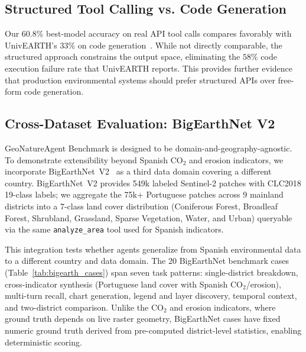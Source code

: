 \documentclass[sigconf]{acmart}
\begin{document}
\subsection{Structured Tool Calling vs. Code Generation}

Our $60.8\%$ best-model accuracy on real API tool calls compares favorably with UnivEARTH's $33\%$ on code generation~\citep{kao2025univearth}. While not directly comparable, the structured approach constrains the output space, eliminating the $58\%$ code execution failure rate that UnivEARTH reports. This provides further evidence that production environmental systems should prefer structured APIs over free-form code generation.

\subsection{Cross-Dataset Evaluation: BigEarthNet V2}
\label{sec:validation}

GeoNatureAgent Benchmark is designed to be domain-and-geogra\-phy-agnostic. To demonstrate extensibility beyond Spanish CO$_2$ and erosion indicators, we incorporate BigEarthNet~V2~\citep{clasen2024reben} as a third data domain covering a different country. BigEarthNet~V2 provides 549k labeled Sentinel-2 patches with CLC2018 19-class labels; we aggregate the 75k+ Portuguese patches across 9 mainland districts into a 7-class land cover distribution (Coniferous Forest, Broadleaf Forest, Shrubland, Grassland, Sparse Vegetation, Water, and Urban) queryable via the same \texttt{analyze\_area} tool used for Spanish indicators.

This integration tests whether agents generalize from Spanish environmental data to a different country and data domain. The 20 BigEarthNet benchmark cases (Table~\ref{tab:bigearth_cases}) span seven task patterns: single-district breakdown, cross-indicator synthesis (Portuguese land cover with Spanish CO$_2$/erosion), multi-turn recall, chart generation, legend and layer discovery, temporal context, and two-district comparison. Unlike the CO$_2$ and erosion indicators, where ground truth depends on live raster geometry, BigEarthNet cases have fixed numeric ground truth derived from pre-computed district-level statistics, enabling deterministic scoring.
\end{document}
